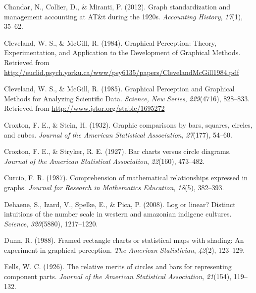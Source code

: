 \documentclass[print]{nuthesis}
\newlength{\cslhangindent}
\newenvironment{CSLReferences}%
{\setlength{\parindent}{0pt}%
\everypar{\setlength{\hangindent}{\cslhangindent}}\ignorespaces}%
{\par}
\begin{document}
\begin{CSLReferences}{1}{0}
\leavevmode{}%
Chandar, N., Collier, D., \& Miranti, P. (2012). Graph standardization and management accounting at AT\&t during the 1920s. \emph{Accounting History}, \emph{17}(1), 35--62.

\leavevmode{}%
Cleveland, W. S., \& McGill, R. (1984). Graphical {Perception}: {Theory}, {Experimentation}, and {Application} to the {Development} of {Graphical} {Methods}. Retrieved from \url{http://euclid.psych.yorku.ca/www/psy6135/papers/ClevelandMcGill1984.pdf}

\leavevmode{}%
Cleveland, W. S., \& McGill, R. (1985). Graphical {Perception} and {Graphical} {Methods} for {Analyzing} {Scientific} {Data}. \emph{Science, New Series}, \emph{229}(4716), 828--833. Retrieved from \url{http://www.jstor.org/stable/1695272}

\leavevmode{}%
Croxton, F. E., \& Stein, H. (1932). Graphic comparisons by bars, squares, circles, and cubes. \emph{Journal of the American Statistical Association}, \emph{27}(177), 54--60.

\leavevmode{}%
Croxton, F. E., \& Stryker, R. E. (1927). Bar charts versus circle diagrams. \emph{Journal of the American Statistical Association}, \emph{22}(160), 473--482.

\leavevmode{}%
Curcio, F. R. (1987). Comprehension of mathematical relationships expressed in graphs. \emph{Journal for Research in Mathematics Education}, \emph{18}(5), 382--393.

\leavevmode{}%
Dehaene, S., Izard, V., Spelke, E., \& Pica, P. (2008). Log or linear? Distinct intuitions of the number scale in western and amazonian indigene cultures. \emph{Science}, \emph{320}(5880), 1217--1220.

\leavevmode{}%
Dunn, R. (1988). Framed rectangle charts or statistical maps with shading: An experiment in graphical perception. \emph{The American Statistician}, \emph{42}(2), 123--129.

\leavevmode{}%
Eells, W. C. (1926). The relative merits of circles and bars for representing component parts. \emph{Journal of the American Statistical Association}, \emph{21}(154), 119--132.


\end{CSLReferences}
\end{document}
